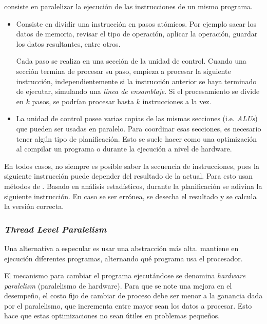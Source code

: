  consiste en paralelizar la ejecución de las instrucciones de un mismo
programa.

\begin{itemize}
  \item {}

    Consiste en dividir una instrucción en pasos atómicos. Por ejemplo
    sacar los datos de memoria, revisar el tipo de operación, aplicar la
    operación, guardar los datos resultantes, entre otros.

    Cada paso se realiza en una sección de la unidad de control. Cuando una
    sección termina de procesar su paso, empieza a procesar la siguiente
    instrucción, independientemente si la instrucción anterior se haya
    terminado de ejecutar, simulando una \emph{línea de ensamblaje}. Si el
    procesamiento se divide en $k$ pasos, se podrían procesar hasta $k$
    instrucciones a la vez.

  \item {}

    La unidad de control posee varias copias de las mismas secciones
    (i.e. \emph{ALUs}) que pueden ser usadas en paralelo. Para coordinar esas
    secciones, es necesario tener algún tipo de planificación. Esto se suele
    hacer como una optimización al compilar un programa o durante la ejecución
    a nivel de hardware.
\end{itemize}

En todos casos, no siempre es posible saber la secuencia de instrucciones, pues
la siguiente instrucción puede depender del resultado de la actual. Para esto
usan métodos de . Basado en análisis estadísticos, durante
la planificación se adivina la siguiente instrucción. En caso se ser errónea,
se desecha el resultado y se calcula la versión correcta.

\subsubsection{\emph{Thread Level Paralelism}}

Una alternativa a especular es usar una abstracción más alta. 
mantiene en ejecución diferentes programas, alternando qué programa usa el
procesador.

El mecanismo para cambiar el programa ejecutándose se denomina \emph{hardware
paralelism} (paralelismo de hardware). Para que se note una mejora en el
desempeño, el costo fijo de cambiar de proceso debe ser menor a la ganancia
dada por el paralelismo, que incrementa entre mayor sean los datos a procesar.
Esto hace que estas optimizaciones no sean útiles en problemas pequeños.

